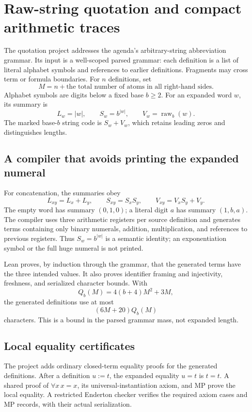 \documentclass[11pt]{article}
\theoremstyle{definition}
\theoremstyle{remark}
\begin{document}
\section{Raw-string quotation and compact arithmetic traces}
\label{sec:quotation}

The quotation project addresses the agenda's arbitrary-string abbreviation
grammar. Its input is a well-scoped parsed grammar: each definition is a list
of literal alphabet symbols and references to earlier definitions. Fragments
may cross term or formula boundaries. For $n$ definitions, set
\[
 M=n+\text{the total number of atoms in all right-hand sides}.
\]
Alphabet symbols are digits below a fixed base $b\ge2$. For an expanded word
$w$, its summary is
\[
 L_w=|w|,\qquad S_w=b^{|w|},\qquad V_w=\operatorname{raw}_b(w).
\]
The marked base-$b$ string code is $S_w+V_w$, which retains leading zeros
and distinguishes lengths.

\subsection{A compiler that avoids printing the expanded numeral}
For concatenation, the summaries obey
\begin{equation}\label{eq:concat}
 L_{xy}=L_x+L_y,\qquad S_{xy}=S_xS_y,\qquad
 V_{xy}=V_xS_y+V_y.
\end{equation}
The empty word has summary $(0,1,0)$; a literal digit $a$ has summary
$(1,b,a)$. The compiler uses three arithmetic registers per source definition
and generates terms containing only binary numerals, addition, multiplication,
and references to previous registers. Thus $S_w=b^{|w|}$ is a semantic
identity; an exponentiation symbol or the full huge numeral is not printed.

Lean proves, by induction through the grammar, that the generated terms have
the three intended values. It also proves identifier framing and injectivity,
freshness, and serialized character bounds. With
\[
 Q_b(M)=4(b+4)M^2+3M,
\]
the generated definitions use at most
\begin{equation}\label{eq:quote-bound}
 (6M+20)Q_b(M)
\end{equation}
characters. This is a bound in the parsed grammar mass, not expanded length.

\subsection{Local equality certificates}
The project adds ordinary closed-term equality proofs for the generated
definitions. After a definition $u:=t$, the expanded equality $u=t$ is $t=t$.
A shared proof of $\forall x\,x=x$, its universal-instantiation axiom, and MP
prove the local equality. A restricted Enderton checker verifies the required
axiom cases and MP records, with their actual serialization.
\end{document}
